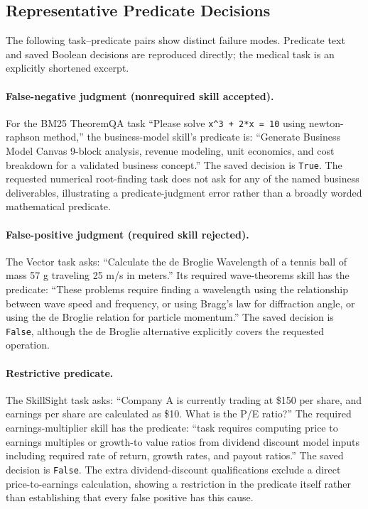\subsection{Representative Predicate Decisions}
The following task--predicate pairs show distinct failure modes. Predicate text and saved Boolean decisions are reproduced directly; the medical task is an explicitly shortened excerpt.

\paragraph{False-negative judgment (nonrequired skill accepted).}
For the BM25 TheoremQA task ``Please solve \texttt{x\textasciicircum{}3 + 2*x = 10} using newton-raphson method,'' the business-model skill's predicate is: ``Generate Business Model Canvas 9-block analysis, revenue modeling, unit economics, and cost breakdown for a validated business concept.'' The saved decision is \texttt{True}. The requested numerical root-finding task does not ask for any of the named business deliverables, illustrating a predicate-judgment error rather than a broadly worded mathematical predicate.

\paragraph{False-positive judgment (required skill rejected).}
The Vector task asks: ``Calculate the de Broglie Wavelength of a tennis ball of mass 57 g traveling 25 m/s in meters.'' Its required wave-theorems skill has the predicate: ``These problems require finding a wavelength using the relationship between wave speed and frequency, or using Bragg's law for diffraction angle, or using the de Broglie relation for particle momentum.'' The saved decision is \texttt{False}, although the de Broglie alternative explicitly covers the requested operation.

\paragraph{Restrictive predicate.}
The SkillSight task asks: ``Company A is currently trading at \$150 per share, and earnings per share are calculated as \$10. What is the P/E ratio?'' The required earnings-multiplier skill has the predicate: ``task requires computing price to earnings multiples or growth-to value ratios from dividend discount model inputs including required rate of return, growth rates, and payout ratios.'' The saved decision is \texttt{False}. The extra dividend-discount qualifications exclude a direct price-to-earnings calculation, showing a restriction in the predicate itself rather than establishing that every false positive has this cause.

